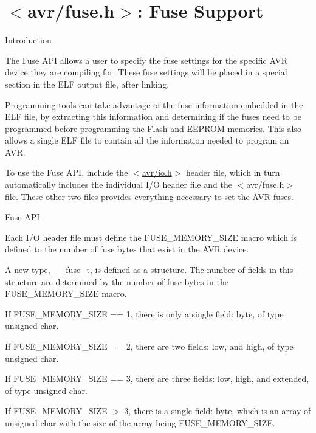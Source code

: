 \hypertarget{group__avr__fuse}{}\section{$<$avr/fuse.h$>$\+: Fuse Support}
\label{group__avr__fuse}
\begin{DoxyParagraph}{Introduction}

\end{DoxyParagraph}
The Fuse A\+PI allows a user to specify the fuse settings for the specific A\+VR device they are compiling for. These fuse settings will be placed in a special section in the E\+LF output file, after linking.

Programming tools can take advantage of the fuse information embedded in the E\+LF file, by extracting this information and determining if the fuses need to be programmed before programming the Flash and E\+E\+P\+R\+OM memories. This also allows a single E\+LF file to contain all the information needed to program an A\+VR.

To use the Fuse A\+PI, include the $<$\hyperlink{io_8h}{avr/io.\+h}$>$ header file, which in turn automatically includes the individual I/O header file and the $<$\hyperlink{fuse_8h}{avr/fuse.\+h}$>$ file. These other two files provides everything necessary to set the A\+VR fuses.

\begin{DoxyParagraph}{Fuse A\+PI}

\end{DoxyParagraph}
Each I/O header file must define the F\+U\+S\+E\+\_\+\+M\+E\+M\+O\+R\+Y\+\_\+\+S\+I\+ZE macro which is defined to the number of fuse bytes that exist in the A\+VR device.

A new type, \+\_\+\+\_\+fuse\+\_\+t, is defined as a structure. The number of fields in this structure are determined by the number of fuse bytes in the F\+U\+S\+E\+\_\+\+M\+E\+M\+O\+R\+Y\+\_\+\+S\+I\+ZE macro.

If F\+U\+S\+E\+\_\+\+M\+E\+M\+O\+R\+Y\+\_\+\+S\+I\+ZE == 1, there is only a single field\+: byte, of type unsigned char.

If F\+U\+S\+E\+\_\+\+M\+E\+M\+O\+R\+Y\+\_\+\+S\+I\+ZE == 2, there are two fields\+: low, and high, of type unsigned char.

If F\+U\+S\+E\+\_\+\+M\+E\+M\+O\+R\+Y\+\_\+\+S\+I\+ZE == 3, there are three fields\+: low, high, and extended, of type unsigned char.

If F\+U\+S\+E\+\_\+\+M\+E\+M\+O\+R\+Y\+\_\+\+S\+I\+ZE $>$ 3, there is a single field\+: byte, which is an array of unsigned char with the size of the array being F\+U\+S\+E\+\_\+\+M\+E\+M\+O\+R\+Y\+\_\+\+S\+I\+ZE.

